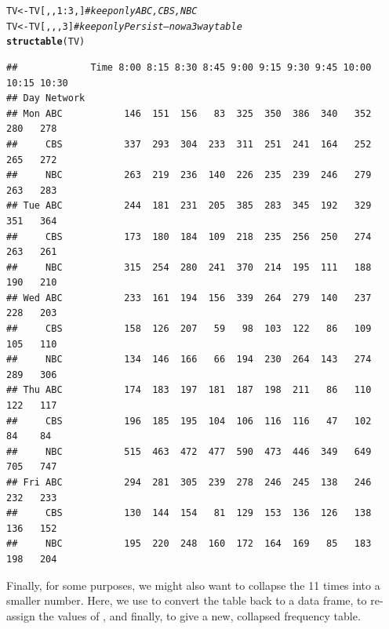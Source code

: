 \documentclass[11pt]{book}\usepackage[]{graphicx}\usepackage[]{color}
\makeatletter
\newcommand{\hlnum}[1]{\textcolor[rgb]{0.686,0.059,0.569}{#1}}%
\newcommand{\hlcom}[1]{\textcolor[rgb]{0.678,0.584,0.686}{\textit{#1}}}%
\newcommand{\hlopt}[1]{\textcolor[rgb]{0,0,0}{#1}}%
\newcommand{\hlstd}[1]{\textcolor[rgb]{0.345,0.345,0.345}{#1}}%
\newcommand{\hlkwb}[1]{\textcolor[rgb]{0.69,0.353,0.396}{#1}}%
\newcommand{\hlkwd}[1]{\textcolor[rgb]{0.737,0.353,0.396}{\textbf{#1}}}%
\newenvironment{kframe}{%
 \def\at@end@of@kframe{}%
 \ifinner\ifhmode%
  \def\at@end@of@kframe{\end{minipage}}%
  \begin{minipage}{\columnwidth}%
 \fi\fi%
 \def\FrameCommand##1{\hskip\@totalleftmargin \hskip-\fboxsep
 \colorbox{shadecolor}{##1}\hskip-\fboxsep
     \hskip-\linewidth \hskip-\@totalleftmargin \hskip\columnwidth}%
 \MakeFramed {\advance\hsize-\width
   \@totalleftmargin\z@ \linewidth\hsize
   \@setminipage}}%
 {\par\unskip\endMakeFramed%
 \at@end@of@kframe}
\newenvironment{knitrout}{}{} %
\renewenvironment{knitrout}{\small\renewcommand{\baselinestretch}{.85}}{} %
\makeatother
\begin{document}
\begin{knitrout}\footnotesize
{}\color{fgcolor}\begin{kframe}
\begin{alltt}
\hlstd{TV} \hlkwb{<-} \hlstd{TV[,,}\hlnum{1}\hlopt{:}\hlnum{3}\hlstd{,]}     \hlcom{# keep only ABC, CBS, NBC}
\hlstd{TV} \hlkwb{<-} \hlstd{TV[,,,}\hlnum{3}\hlstd{]}       \hlcom{# keep only Persist -- now a 3 way table}
\hlkwd{structable}\hlstd{(TV)}
\end{alltt}
\begin{verbatim}
##             Time 8:00 8:15 8:30 8:45 9:00 9:15 9:30 9:45 10:00 10:15 10:30
## Day Network                                                               
## Mon ABC           146  151  156   83  325  350  386  340   352   280   278
##     CBS           337  293  304  233  311  251  241  164   252   265   272
##     NBC           263  219  236  140  226  235  239  246   279   263   283
## Tue ABC           244  181  231  205  385  283  345  192   329   351   364
##     CBS           173  180  184  109  218  235  256  250   274   263   261
##     NBC           315  254  280  241  370  214  195  111   188   190   210
## Wed ABC           233  161  194  156  339  264  279  140   237   228   203
##     CBS           158  126  207   59   98  103  122   86   109   105   110
##     NBC           134  146  166   66  194  230  264  143   274   289   306
## Thu ABC           174  183  197  181  187  198  211   86   110   122   117
##     CBS           196  185  195  104  106  116  116   47   102    84    84
##     NBC           515  463  472  477  590  473  446  349   649   705   747
## Fri ABC           294  281  305  239  278  246  245  138   246   232   233
##     CBS           130  144  154   81  129  153  136  126   138   136   152
##     NBC           195  220  248  160  172  164  169   85   183   198   204
\end{verbatim}
\end{kframe}
\end{knitrout}


Finally, for some purposes, we might also want to collapse the 11 times into a smaller number.
Here, we use  to convert the table back to a data frame,
  to re-assign the values of ,
 and finally,  to give a new, collapsed frequency table.
\end{document}
